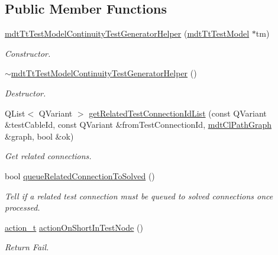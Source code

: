 \subsection*{Public Member Functions}
\begin{DoxyCompactItemize}
\item 
\hyperlink{classmdt_tt_test_model_continuity_test_generator_helper_ac3daeafb75b1ebe75a195c2981a3838a}{mdt\-Tt\-Test\-Model\-Continuity\-Test\-Generator\-Helper} (\hyperlink{classmdt_tt_test_model}{mdt\-Tt\-Test\-Model} $\ast$tm)
\begin{DoxyCompactList}\small\item\em Constructor. \end{DoxyCompactList}\item 
\hyperlink{classmdt_tt_test_model_continuity_test_generator_helper_ae60faf01babbf01b4316e19f75e00651}{$\sim$mdt\-Tt\-Test\-Model\-Continuity\-Test\-Generator\-Helper} ()
\begin{DoxyCompactList}\small\item\em Destructor. \end{DoxyCompactList}\item 
Q\-List$<$ Q\-Variant $>$ \hyperlink{classmdt_tt_test_model_continuity_test_generator_helper_a22d6cca0047ce6064c68ebb5864b8cd7}{get\-Related\-Test\-Connection\-Id\-List} (const Q\-Variant \&test\-Cable\-Id, const Q\-Variant \&from\-Test\-Connection\-Id, \hyperlink{classmdt_cl_path_graph}{mdt\-Cl\-Path\-Graph} \&graph, bool \&ok)
\begin{DoxyCompactList}\small\item\em Get related connections. \end{DoxyCompactList}\item 
bool \hyperlink{classmdt_tt_test_model_continuity_test_generator_helper_a354712821afbc80e84117b5fa95fd263}{queue\-Related\-Connection\-To\-Solved} ()
\begin{DoxyCompactList}\small\item\em Tell if a related test connection must be queued to solved connections once processed. \end{DoxyCompactList}\item 
\hyperlink{classmdt_tt_test_model_abstract_generator_helper_abc4f8e08285031633b19282d517cc0b5}{action\-\_\-t} \hyperlink{classmdt_tt_test_model_continuity_test_generator_helper_ab326d9310859f4f726ddd21f5ab4f4e7}{action\-On\-Short\-In\-Test\-Node} ()
\begin{DoxyCompactList}\small\item\em Return Fail. \end{DoxyCompactList}\item 

\end{DoxyCompactItemize}
